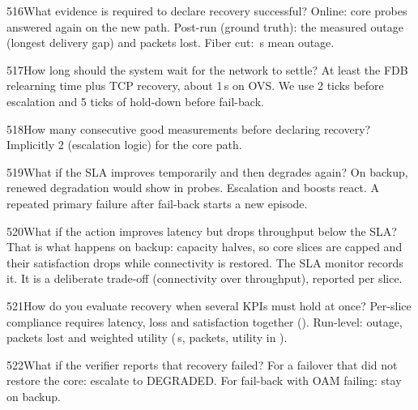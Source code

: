 \begin{qa}{516}{What evidence is required to declare recovery successful?}
Online: core probes answered again on the new path. Post-run (ground truth): the measured outage (longest delivery
gap) and packets lost. Fiber cut: \NOutCutFullMean\,s mean outage.
\end{qa}

\begin{qa}{517}{How long should the system wait for the network to settle?}
At least the FDB relearning time plus TCP recovery, about 1\,s on OVS. We use 2 ticks before escalation and 5 ticks of
hold-down before fail-back.
\end{qa}

\begin{qa}{518}{How many consecutive good measurements before declaring recovery?}
Implicitly 2 (escalation logic) for the core path.
\end{qa}

\begin{qa}{519}{What if the SLA improves temporarily and then degrades again?}
On backup, renewed degradation would show in probes. Escalation and boosts react. A repeated primary failure after
fail-back starts a new episode.
\end{qa}

\begin{qa}{520}{What if the action improves latency but drops throughput below the SLA?}
That is what happens on backup: capacity halves, so core slices are capped and their satisfaction drops while
connectivity is restored. The SLA monitor records it. It is a deliberate trade-off (connectivity over throughput),
reported per slice.
\end{qa}

\begin{qa}{521}{How do you evaluate recovery when several KPIs must hold at once?}
Per-slice compliance requires latency, loss and satisfaction together (). Run-level: outage, packets lost
and weighted utility (\NOutCutFullMean\,s, \NLostCutFull{} packets, utility in ).
\end{qa}

\begin{qa}{522}{What if the verifier reports that recovery failed?}
For a failover that did not restore the core: escalate to \textsf{DEGRADED}. For fail-back with OAM failing: stay on
backup.
\end{qa}

